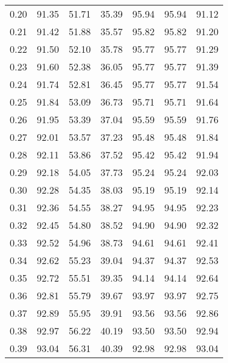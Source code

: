 \begin{tabular}{|c|c|c|c|c|c|c|}
      0.20 &     91.35 &     51.71 &      35.39 &   95.94 &      95.94 &         91.12 \\
      0.21 &     91.42 &     51.88 &      35.57 &   95.82 &      95.82 &         91.20 \\
      0.22 &     91.50 &     52.10 &      35.78 &   95.77 &      95.77 &         91.29 \\
      0.23 &     91.60 &     52.38 &      36.05 &   95.77 &      95.77 &         91.39 \\
      0.24 &     91.74 &     52.81 &      36.45 &   95.77 &      95.77 &         91.54 \\
      0.25 &     91.84 &     53.09 &      36.73 &   95.71 &      95.71 &         91.64 \\
      0.26 &     91.95 &     53.39 &      37.04 &   95.59 &      95.59 &         91.76 \\
      0.27 &     92.01 &     53.57 &      37.23 &   95.48 &      95.48 &         91.84 \\
      0.28 &     92.11 &     53.86 &      37.52 &   95.42 &      95.42 &         91.94 \\
      0.29 &     92.18 &     54.05 &      37.73 &   95.24 &      95.24 &         92.03 \\
      0.30 &     92.28 &     54.35 &      38.03 &   95.19 &      95.19 &         92.14 \\
      0.31 &     92.36 &     54.55 &      38.27 &   94.95 &      94.95 &         92.23 \\
      0.32 &     92.45 &     54.80 &      38.52 &   94.90 &      94.90 &         92.32 \\
      0.33 &     92.52 &     54.96 &      38.73 &   94.61 &      94.61 &         92.41 \\
      0.34 &     92.62 &     55.23 &      39.04 &   94.37 &      94.37 &         92.53 \\
      0.35 &     92.72 &     55.51 &      39.35 &   94.14 &      94.14 &         92.64 \\
      0.36 &     92.81 &     55.79 &      39.67 &   93.97 &      93.97 &         92.75 \\
      0.37 &     92.89 &     55.95 &      39.91 &   93.56 &      93.56 &         92.86 \\
      0.38 &     92.97 &     56.22 &      40.19 &   93.50 &      93.50 &         92.94 \\
      0.39 &     93.04 &     56.31 &      40.39 &   92.98 &      92.98 &         93.04 \\

\end{tabular}
